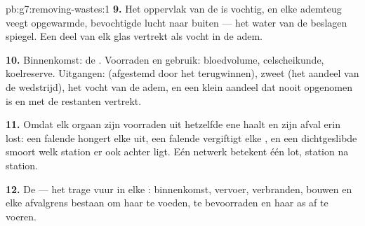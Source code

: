 \begin{solution}{pb:g7:removing-wastes:1}
\textbf{9.} Het oppervlak van de  is vochtig, en elke ademteug
veegt opgewarmde, bevochtigde lucht naar buiten --- het water van de
beslagen spiegel. Een deel van elk glas vertrekt als vocht in de adem.

\textbf{10.} Binnenkomst: de . Voorraden en gebruik:
bloedvolume, celscheikunde, koelreserve. Uitgangen:  (afgestemd door
het terugwinnen), zweet (het aandeel van de wedstrijd), het vocht van de
adem, en een klein aandeel dat nooit opgenomen is en met de restanten
vertrekt.

\textbf{11.} Omdat elk orgaan zijn voorraden uit hetzelfde ene  haalt
en zijn afval erin lost: een falende  hongert elke  uit, een
falende  vergiftigt elke , en een dichtgeslibde  smoort
welk station er ook achter ligt. Eén netwerk betekent één lot, station na
station.

\textbf{12.} De  --- het trage vuur in elke : binnenkomst,
vervoer, verbranden, bouwen en elke afvalgrens bestaan om haar te voeden,
te bevoorraden en haar as af te voeren.
\end{solution}
